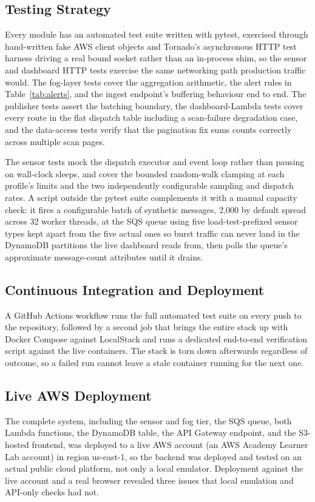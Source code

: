 \documentclass[conference]{IEEEtran}
\begin{document}
\subsection{Testing Strategy}
Every module has an automated test suite written with pytest, exercised through hand-written fake AWS client objects and Tornado's asynchronous HTTP test harness driving a real bound socket rather than an in-process shim, so the sensor and dashboard HTTP tests exercise the same networking path production traffic would. The fog-layer tests cover the aggregation arithmetic, the alert rules in Table~\ref{tab:alerts}, and the ingest endpoint's buffering behaviour end to end. The publisher tests assert the batching boundary, the dashboard-Lambda tests cover every route in the flat dispatch table including a scan-failure degradation case, and the data-access tests verify that the pagination fix sums counts correctly across multiple scan pages.

The sensor tests mock the dispatch executor and event loop rather than pausing on wall-clock sleeps, and cover the bounded random-walk clamping at each profile's limits and the two independently configurable sampling and dispatch rates. A script outside the pytest suite complements it with a manual capacity check: it fires a configurable batch of synthetic messages, 2,000 by default spread across 32 worker threads, at the SQS queue using five load-test-prefixed sensor types kept apart from the five actual ones so burst traffic can never land in the DynamoDB partitions the live dashboard reads from, then polls the queue's approximate message-count attributes until it drains.

\subsection{Continuous Integration and Deployment}
A GitHub Actions workflow runs the full automated test suite on every push to the repository, followed by a second job that brings the entire stack up with Docker Compose against LocalStack and runs a dedicated end-to-end verification script against the live containers. The stack is torn down afterwards regardless of outcome, so a failed run cannot leave a stale container running for the next one.

\subsection{Live AWS Deployment}
The complete system, including the sensor and fog tier, the SQS queue, both Lambda functions, the DynamoDB table, the API Gateway endpoint, and the S3-hosted frontend, was deployed to a live AWS account (an AWS Academy Learner Lab account) in region us-east-1, so the backend was deployed and tested on an actual public cloud platform, not only a local emulator. Deployment against the live account and a real browser revealed three issues that local emulation and API-only checks had not.
\end{document}
